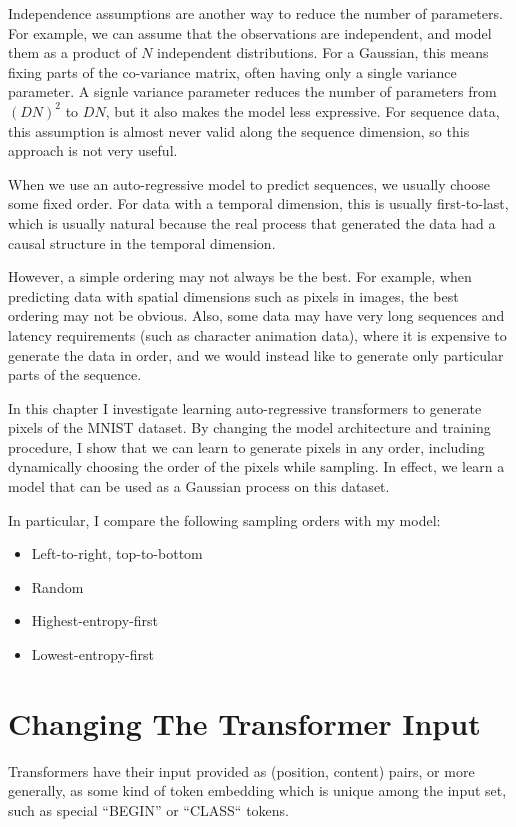 Independence assumptions are another way to reduce the number of parameters. For example, we can assume that the observations are independent, and model them as a product of $N$ independent distributions. For a Gaussian, this means fixing parts of the co-variance matrix, often having only a single variance parameter. A signle variance parameter reduces the number of parameters from $(DN)^2$ to $DN$, but it also makes the model less expressive. For sequence data, this assumption is almost never valid along the sequence dimension, so this approach is not very useful.

When we use an auto-regressive model to predict sequences, we usually choose some fixed order. For data with a temporal dimension, this is usually first-to-last, which is usually natural because the real process that generated the data had a causal structure in the temporal dimension.

However, a simple ordering may not always be the best. For example, when predicting data with spatial dimensions such as pixels in images, the best ordering may not be obvious. Also, some data may have very long sequences and latency requirements (such as character animation data), where it is expensive to generate the data in order, and we would instead like to generate only particular parts of the sequence.

In this chapter I investigate learning auto-regressive transformers to generate pixels of the MNIST dataset. By changing the model architecture and training procedure, I show that we can learn to generate pixels in any order, including dynamically choosing the order of the pixels while sampling. In effect, we learn a model that can be used as a Gaussian process on this dataset.

In particular, I compare the following sampling orders with my model:
\begin{itemize}
    \item Left-to-right, top-to-bottom
    \item Random
    \item Highest-entropy-first
    \item Lowest-entropy-first
\end{itemize}

\section{Changing The Transformer Input}
\label{s:transformer-inputs}

Transformers have their input provided as (position, content) pairs, or more generally, as some kind of token embedding which is unique among the input set, such as special ``BEGIN'' or ``CLASS`` tokens.

